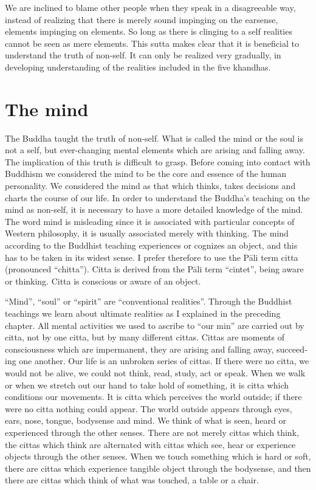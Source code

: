 \documentclass{book}
\begin{document}
We are inclined to blame other people when they speak in a disagreeable
way, instead of realizing that there is merely sound impinging on the
earsense, elements impinging on elements. So long as there is clinging
to a self realities cannot be seen as mere elements. This sutta makes
clear that it is beneficial to understand the truth of non-self. It can
only be realized very gradually, in developing understanding of the
realities included in the five khandhas.

\chapter{The mind}

The Buddha taught the truth of non-self. What is called the mind or the
soul is not a self, but ever-changing mental elements which are arising
and falling away. The implication of this truth is difficult to grasp.
Before coming into contact with Buddhism we considered the mind to be
the core and essence of the human personality. We considered the mind as
that which thinks, takes decisions and charts the course of our life. In
order to understand the Buddha's teaching on the mind as non-self, it is
necessary to have a more detailed knowledge of the mind. The word mind
is misleading since it is associated with particular concepts of Western
philosophy, it is usually associated merely with thinking. The mind
according to the Buddhist teaching experiences or cognizes an object,
and this has to be taken in its widest sense. I prefer therefore to use
the Pāli term citta (pronounced ``chitta''). Citta is derived from the
Pāli term ``cintet'', being aware or thinking. Citta is conscious or
aware of an object.

``Mind'', ``soul'' or ``spirit'' are ``conventional realities''. Through
the Buddhist teachings we learn about ultimate realities as I explained
in the preceding chapter. All mental activities we used to ascribe to ``our min'' are carried out by citta, not by one citta, but by many
different cittas. Cittas are moments of consciousness which are
imper­manent, they are arising and falling away, succeed­ing one
another. Our life is an unbroken series of cittas. If there were no
citta, we would not be alive, we could not think, read, study, act or
speak. When we walk or when we stretch out our hand to take hold of
something, it is citta which conditions our movements. It is citta which
per­ceives the world outside; if there were no citta nothing could
appear. The world outside appears through eyes, ears, nose, tongue,
bodysense and mind. We think of what is seen, heard or experienced
through the other senses. There are not merely cittas which think, the
cittas which think are alternated with cittas which see, hear or
experience objects through the other senses. When we touch something
which is hard or soft, there are cittas which experience tangible object
through the bodysense, and then there are cittas which think of what was
touched, a table or a chair.
\end{document}
